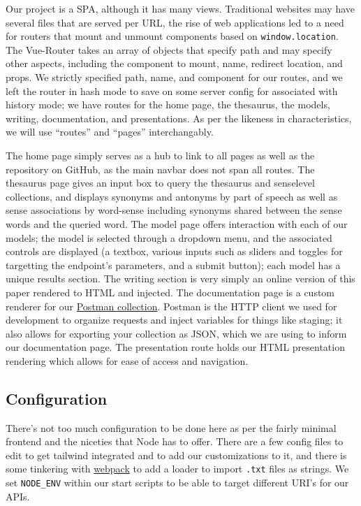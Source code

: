 \documentclass[11pt, twoside, reqno]{book}
\begin{document}
Our project is a SPA, although it has many views. Traditional websites may have several files that are served per URL, the rise of web applications led to a need for routers that mount and unmount components based on \texttt{window.location}. The Vue-Router takes an array of objects that specify path and may specify other aspects, including the component to mount, name, redirect location, and props. We strictly specified path, name, and component for our routes, and we left the router in hash mode to save on some server config for associated with history mode; we have routes for the home page, the thesaurus, the models, writing, documentation, and presentations. As per the likeness in characteristics, we will use ``routes'' and ``pages'' interchangably.

The home page simply serves as a hub to link to all pages as well as the repository on GitHub, as the main navbar does not span all routes. The thesaurus page gives an input box to query the thesaurus and senselevel collections, and displays synonyms and antonyms by part of speech as well as sense associations by word-sense including synonyms shared between the sense words and the queried word. The model page offers interaction with each of our models; the model is selected through a dropdown menu, and the associated controls are displayed (a textbox, various inputs such as sliders and toggles for targetting the endpoint's parameters, and a submit button); each model has a unique results section. The writing section is very simply an online version of this paper rendered to HTML and injected. The documentation page is a custom renderer for our \href{https://www.postman.com/}{Postman collection}. Postman is the HTTP client we used for development to organize requests and inject variables for things like staging; it also allows for exporting your collection as JSON, which we are using to inform our documentation page. The presentation route holds our HTML presentation rendering which allows for ease of access and navigation.

\subsection{Configuration}

There's not too much configuration to be done here as per the fairly minimal frontend and the niceties that Node has to offer. There are a few config files to edit to get tailwind integrated and to add our customizations to it, and there is some tinkering with \href{https://webpack.js.org/}{webpack} to add a loader to import \texttt{.txt} files as strings. We set \texttt{NODE\_ENV} within our start scripts to be able to target different URI's for our APIs.
\end{document}
